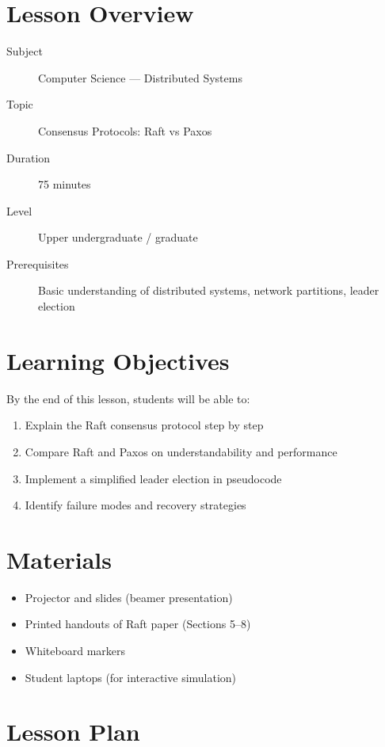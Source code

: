 \documentclass[
    language=english,
    doctype=lesson-plan,
    institution=none,
]{../../omnilatex}
\begin{document}
\maketitle

\section*{Lesson Overview}

\begin{description}
    \item[Subject] Computer Science --- Distributed Systems
    \item[Topic] Consensus Protocols: Raft vs Paxos
    \item[Duration] 75 minutes
    \item[Level] Upper undergraduate / graduate
    \item[Prerequisites] Basic understanding of distributed systems,
      network partitions, leader election
\end{description}

\section*{Learning Objectives}
By the end of this lesson, students will be able to:
\begin{enumerate}
    \item Explain the Raft consensus protocol step by step
    \item Compare Raft and Paxos on understandability and performance
    \item Implement a simplified leader election in pseudocode
    \item Identify failure modes and recovery strategies
\end{enumerate}

\section*{Materials}
\begin{itemize}
    \item Projector and slides (beamer presentation)
    \item Printed handouts of Raft paper (Sections 5--8)
    \item Whiteboard markers
    \item Student laptops (for interactive simulation)
\end{itemize}

\section*{Lesson Plan}
\end{document}

